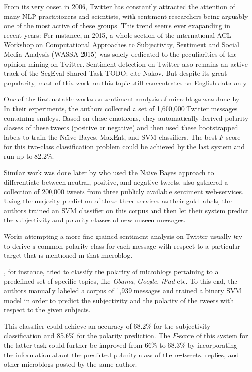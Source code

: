 From its very onset in 2006, Twitter has constantly attracted the
attention of many NLP-practitioners and scientists, with sentiment
researchers being arguably one of the most active of these groups.
This trend seems ever exapanding in recent years: For instance, in
2015, a whole section of the international ACL Workshop on
Computational Approaches to Subjectivity, Sentiment and Social Media
Analysis (WASSA 2015) was solely dedicated to the peculiarities of the
opinion mining on Twitter.  Sentiment detection on Twitter also
remains an active track of the SegEval Shared Task TODO: cite Nakov.
But despite its great popularity, most of this work on this topic
still concentrates on English data only.

One of the first notable works on sentiment analysis of microblogs was
done by \citet{Go:09}.  In their experiments, the authors collected a
set of 1,600,000 Twitter messages containing smileys.  Based on these
emoticons, they automatically derived polarity classes of these tweets
(positive or negative) and then used these bootstrapped labels to
train the Na\"{\i}ve Bayes, MaxEnt, and SVM classifiers.  The best
$F$-score for this two-class classification problem could be achieved
by the last system and run up to 82.2\%.

Similar work was done later by \citet{Pak:10} who used the Na\"{\i}ve
Bayes approach to differentiate between neutral, positive, and
negative tweets. \citet{Barbosa:10} also gathered a collection of
200,000 tweets from three publicly available sentiment web-services.
Using the majority prediction of these three services as their gold
labels, the authors trained an SVM classifier on this corpus and then
let their system predict the subjectivity and polarity classes of new
unseen messages.

Works attempting a more fine-grained sentiment analysis on Twitter
usually try to derive a common polarity class for each message with
respect to a particular target that is mentioned in that microblog.

\citet{Jiang:11}, for instance, tried to classify the polarity of
microblogs pertaining to a predefined set of specific topics, like
\emph{Obama}, \emph{Google}, \emph{iPad} etc.  To this end, the
authors manually labeled a corpus of 1,939 messages and trained a
binary SVM model in order to predict the subjectivity and the polarity
of the tweets with respect to the given subjects.

This classifier could achieve an accuracy of 68.2\% for the
subjectivity classification and 85.6\% for the polarity prediction.
The $F$-score of this system for the latter task could further be
improved from 66\% to 68.3\% by incorporating the information about
the predicted polarity class of the re-tweets, replies, and other
microblogs posted by the same author.

